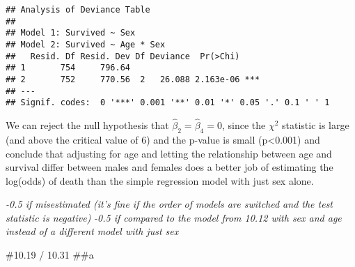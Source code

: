 \documentclass[]{article}
\newenvironment{Shaded}{\begin{snugshade}}{\end{snugshade}}
\newcommand{\DataTypeTok}[1]{\textcolor[rgb]{0.13,0.29,0.53}{#1}}
\newcommand{\KeywordTok}[1]{\textcolor[rgb]{0.13,0.29,0.53}{\textbf{#1}}}
\newcommand{\NormalTok}[1]{#1}
\newcommand{\OperatorTok}[1]{\textcolor[rgb]{0.81,0.36,0.00}{\textbf{#1}}}
\newcommand{\OtherTok}[1]{\textcolor[rgb]{0.56,0.35,0.01}{#1}}
\newcommand{\StringTok}[1]{\textcolor[rgb]{0.31,0.60,0.02}{#1}}
\begin{document}
\begin{verbatim}
## Analysis of Deviance Table
## 
## Model 1: Survived ~ Sex
## Model 2: Survived ~ Age * Sex
##   Resid. Df Resid. Dev Df Deviance  Pr(>Chi)    
## 1       754     796.64                          
## 2       752     770.56  2   26.088 2.163e-06 ***
## ---
## Signif. codes:  0 '***' 0.001 '**' 0.01 '*' 0.05 '.' 0.1 ' ' 1
\end{verbatim}

We can reject the null hypothesis that \(\hat\beta_2=\hat\beta_4=0\),
since the \(\chi^2\) statistic is large (and above the critical value of
6) and the p-value is small (p\textless{}0.001) and conclude that
adjusting for age and letting the relationship between age and survival
differ between males and females does a better job of estimating the
log(odds) of death than the simple regression model with just sex alone.

\emph{-0.5 if misestimated (it's fine if the order of models are
switched and the test statistic is negative) } \emph{-0.5 if compared to
the model from 10.12 with sex and age instead of a different model with
just sex}

\#10.19 / 10.31 \#\#a

\begin{Shaded}
\end{Shaded}
\end{document}
